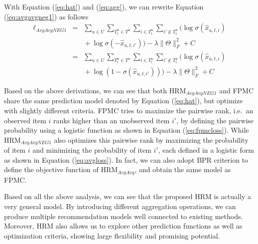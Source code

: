 \documentclass[10pt,journal,compsoc]{IEEEtran}
\begin{document}
With Equation (\ref{eq:hat}) and (\ref{eq:agg}), we can rewrite Equation (\ref{eq:avgavgneg1}) as follows
\begin{eqnarray}\label{eq:avgloss}
    \ell_{AvgAvgNEG1}\!\!\!\!&=&\!\!\!\!\sum_{u\in U}\sum_{T^u_t\in T^u}\sum_{i\in T^u_t}\sum_{i'\not\in T^u_t}\Big(\log\sigma(\hat{x}_{u,t,i})\nonumber\\
    \!\!\!\!&&\!\!\!\!+\log\sigma(-\hat{x}_{u,t,i'})\Big)-\lambda\parallel\Theta\parallel^2_F + C\nonumber\\
    \!\!\!\!&=&\!\!\!\!\sum_{u\in U}\sum_{T^u_t\in T^u}\sum_{i\in T^u_t}\sum_{i'\not\in T^u_t}\Big(\log\sigma(\hat{x}_{u,t,i})\nonumber\\
    \!\!\!\!&&\!\!\!\!+\log(1-\sigma(\hat{x}_{u,t,i'}))\Big)-\lambda\parallel\Theta\parallel^2_F + C
\end{eqnarray}

Based on the above derivations, we can see that both HRM$_{AvgAvgNEG1}$ and FPMC share the same prediction model denoted by Equation (\ref{eq:hat}), but optimize with slightly different criteria. FPMC tries to maximize the pairwise rank, i.e.~an observed item $i$ ranks higher than an unobserved item $i'$, by defining the pairwise probability using a logistic function as shown in Equation (\ref{eq:fpmcloss}). While HRM$_{AvgAvgNEG1}$ also optimizes this pairwise rank by maximizing the probability of item $i$ and minimizing the probability of item $i'$, each defined in a logistic form as shown in Equation (\ref{eq:avgloss}). In fact, we can also adopt BPR criterion to define the objective function of HRM$_{AvgAvg}$, and obtain the same model as FPMC.

Based on all the above analysis, we can see that the proposed HRM is actually a very general model. By introducing different aggregation operations, we can produce multiple recommendation models well connected to existing methods. Moreover, HRM also allows us to explore other prediction functions as well as optimization criteria, showing large flexibility and promising potential.
\end{document}
